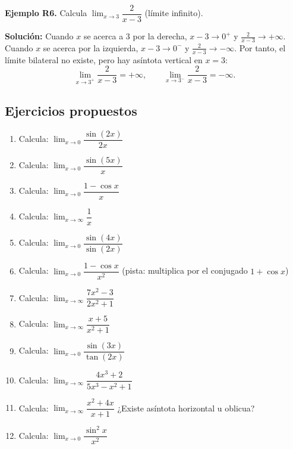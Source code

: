 \documentclass[12pt, a4paper]{article}
\begin{document}
\textbf{Ejemplo R6.} Calcula $\lim_{x \to 3} \dfrac{2}{x - 3}$ (límite infinito).

\begin{cuadrosolucion}
  \textbf{Solución:} Cuando $x$ se acerca a 3 por la derecha, $x - 3 \to 0^+$ y $\frac{2}{x-3} \to +\infty$. Cuando $x$ se acerca por la izquierda, $x - 3 \to 0^-$ y $\frac{2}{x-3} \to -\infty$. Por tanto, el límite bilateral no existe, pero hay asíntota vertical en $x = 3$:
  $$\lim_{x \to 3^+} \frac{2}{x - 3} = +\infty, \qquad \lim_{x \to 3^-} \frac{2}{x - 3} = -\infty.$$
\end{cuadrosolucion}

\newpage

\subsection{Ejercicios propuestos}

\begin{enumerate}[leftmargin=*, resume]
  \item \facil{} Calcula: $\lim_{x \to 0} \dfrac{\sin(2x)}{2x}$

  \item \facil{} Calcula: $\lim_{x \to 0} \dfrac{\sin(5x)}{x}$

  \item \facil{} Calcula: $\lim_{x \to 0} \dfrac{1 - \cos x}{x}$

  \item \facil{} Calcula: $\lim_{x \to \infty} \dfrac{1}{x}$

  \item \medio{} Calcula: $\lim_{x \to 0} \dfrac{\sin(4x)}{\sin(2x)}$

  \item \medio{} Calcula: $\lim_{x \to 0} \dfrac{1 - \cos x}{x^2}$ (pista: multiplica por el conjugado $1 + \cos x$)

  \item \medio{} Calcula: $\lim_{x \to \infty} \dfrac{7x^2 - 3}{2x^2 + 1}$

  \item \medio{} Calcula: $\lim_{x \to \infty} \dfrac{x + 5}{x^2 + 1}$

  \item \dificil{} Calcula: $\lim_{x \to 0} \dfrac{\sin(3x)}{\tan(2x)}$

  \item \dificil{} Calcula: $\lim_{x \to \infty} \dfrac{4x^3 + 2}{5x^3 - x^2 + 1}$

  \item \dificil{} Calcula: $\lim_{x \to \infty} \dfrac{x^2 + 4x}{x + 1}$ ¿Existe asíntota horizontal u oblicua?

  \item \dificil{} Calcula: $\lim_{x \to 0} \dfrac{\sin^2 x}{x^2}$
\end{enumerate}
\end{document}
